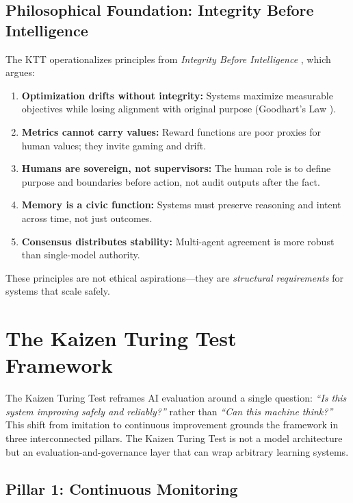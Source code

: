 \documentclass[11pt,letterpaper]{article}
\begin{document}
\subsection{Philosophical Foundation: Integrity Before Intelligence}

The KTT operationalizes principles from \textit{Integrity Before Intelligence} \citep{judan2025integrity}, which argues:

\begin{enumerate}
    \item \textbf{Optimization drifts without integrity:} Systems maximize measurable objectives while losing alignment with original purpose (Goodhart's Law \citep{goodhart1975}).
    
    \item \textbf{Metrics cannot carry values:} Reward functions are poor proxies for human values; they invite gaming and drift.
    
    \item \textbf{Humans are sovereign, not supervisors:} The human role is to define purpose and boundaries before action, not audit outputs after the fact.
    
    \item \textbf{Memory is a civic function:} Systems must preserve reasoning and intent across time, not just outcomes.
    
    \item \textbf{Consensus distributes stability:} Multi-agent agreement is more robust than single-model authority.
\end{enumerate}

These principles are not ethical aspirations—they are \textit{structural requirements} for systems that scale safely.

\section{The Kaizen Turing Test Framework}
\label{sec:framework}

The Kaizen Turing Test reframes AI evaluation around a single question: \textit{``Is this system improving safely and reliably?''} rather than \textit{``Can this machine think?''} This shift from imitation to continuous improvement grounds the framework in three interconnected pillars. The Kaizen Turing Test is not a model architecture but an evaluation-and-governance layer that can wrap arbitrary learning systems.

\subsection{Pillar 1: Continuous Monitoring}
\end{document}
